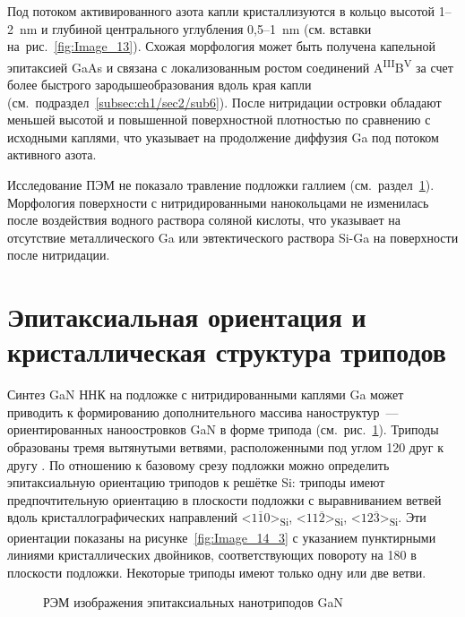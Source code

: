 Под потоком активированного азота капли кристаллизуются в кольцо высотой
1--2~\si{\nano\meter} и глубиной центрального углубления
0,5--1~\si{\nano\meter} (см. вставки на~рис.~\cref{fig:Image_13}). Схожая
морфология может быть получена капельной эпитаксией GaAs \cite{Zhou2013} и
связана с локализованным ростом соединений
A\textsuperscript{III}B\textsuperscript{V} за счет более быстрого
зародышеобразования вдоль края капли
(см.~подраздел~\cref{subsec:ch1/sec2/sub6}). После нитридации островки обладают
меньшей высотой и повышенной поверхностной плотностью по сравнению с исходными
каплями, что указывает на продолжение диффузия Ga под потоком активного азота.

Исследование ПЭМ не показало травление подложки галлием
(см.~раздел~\cref{sec:ch3/sec3}). Морфология поверхности с
нитридированными нанокольцами не изменилась после воздействия водного
раствора соляной кислоты, что указывает на отсутствие металлического Ga или
эвтектического раствора Si-Ga на поверхности после нитридации.

\section{Эпитаксиальная ориентация и кристаллическая структура триподов}\label{sec:ch3/sec3}

Синтез GaN ННК на подложке с нитридированными каплями Ga может приводить к
формированию дополнительного массива наноструктур~--- ориентированных
наноостровков GaN в форме трипода (см.~рис.~\cref{fig:Image_14_12}). Триподы
образованы тремя вытянутыми ветвями, расположенными под углом 120{\textdegree}
друг к другу \cite{kente2016gallium}. По отношению к базовому срезу подложки можно определить
эпитаксиальную ориентацию триподов к решётке Si: триподы имеют предпочтительную
ориентацию в плоскости подложки с выравниванием ветвей вдоль
кристаллографических направлений <\(1\overline{1}0\)>\textsubscript{Si},
<\(11\overline{2}\)>\textsubscript{Si}, <\(12\overline{3}\)>\textsubscript{Si}.
Эти ориентации показаны на рисунке~\cref{fig:Image_14_3} с указанием
пунктирными линиями кристаллических двойников, соответствующих повороту на
180{\textdegree} в плоскости подложки. Некоторые триподы имеют только одну или
две ветви.

\begin{figure}[ht] 
			 \caption{РЭМ изображения
		эпитаксиальных нанотриподов GaN}\label{fig:Image_14_12} \end{figure}


